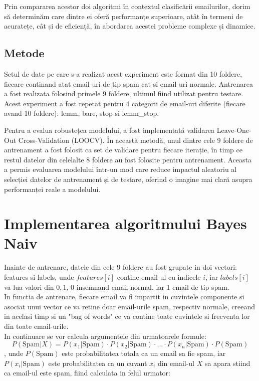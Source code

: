 \documentclass{article}
\begin{document}
Prin compararea acestor doi algoritmi în contextul clasificării emailurilor, dorim să determinăm care dintre ei oferă performanțe superioare, atât în termeni de acuratețe, cât și de eficiență, în abordarea acestei probleme complexe și dinamice.

\subsection{Metode}
    Setul de date pe care s-a realizat acest experiment este format din 10 foldere, fiecare continand atat email-uri de tip spam cat si email-uri normale. Antrenarea a fost realizata folosind primele 9 foldere, ultimul fiind utilizat pentru testare. Acest experiment a fost repetat pentru 4 categorii de email-uri diferite (fiecare avand 10 foldere): lemm, bare, stop si lemm\_stop. 

    Pentru a evalua robustețea modelului, a fost implementată validarea Leave-One-Out Cross-Validation (LOOCV). În această metodă, unul dintre cele 9 foldere de antrenament a fost folosit ca set de validare pentru fiecare iterație, în timp ce restul datelor din celelalte 8 foldere au fost folosite pentru antrenament. Aceasta a permis evaluarea modelului într-un mod care reduce impactul aleatoriu al selecției datelor de antrenament și de testare, oferind o imagine mai clară asupra performanței reale a modelului.


\section{Implementarea algoritmului Bayes Naiv}
    Inainte de antrenare, datele din cele 9 foldere au fost grupate in doi vectori: features si labels, unde $features[i]$ contine email-ul cu indicele $i$, iar $labels[i]$ va lua valori din ${0,1}$, 0 insemnand email normal, iar 1 email de tip spam.
    \\ 
    In functia de antrenare, fiecare email va fi impartit in cuvintele componente si asociat unui vector ce va retine doar email-urile spam, respectiv normale, creeand in acelasi timp si un "bag of words" ce va contine toate cuvintele si frecventa lor din toate email-urile.\\
    In continuare se vor calcula argumentele din urmatoarele formule:
    \[ P(\text{Spam} | X) = P(x_1 | \text{Spam}) \cdot P(x_2 | \text{Spam}) \cdot \ldots \cdot P(x_n | \text{Spam}) \cdot P(\text{Spam}) \], unde $P(\text{Spam})$ este probabilitatea totala ca un email sa fie spam, iar $P(x_i | \text{Spam})$ este probabilitatea ca un cuvant $x_i$ din email-ul $X$ sa apara stiind ca email-ul este spam, fiind calculata in felul urmator: \\
    
\end{document}
